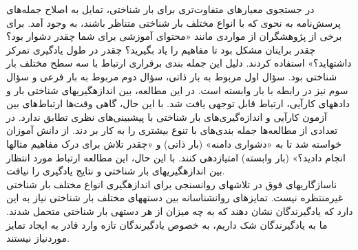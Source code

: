 در جستجوی معيارهای متفاوت‌تری برای بار شناختی، تمایل به اصلاح جمله‌های پرسش‌نامه به نحوی كه
با  انواع مختلف  بار  شناختی متناظر  باشند، به  وجود  آمد.  برای برخی از  پژوهشگران  از  مواردی مانند
«محتوای آموزشی برای شما چقدر دشوار بود؟ چقدر برایتان مشکل بود تا مفاهيم را یاد بگيرید؟ چقدر در 
طول یادگيری تمركز داشتهاید؟» استفاده كردند. دليل این جمله بندی برقراری ارتباط با سه سطح مختلف 
بار شناختی بود. سؤال اول مربوط به بار ذاتی، سؤال دوم مربوط به بار فرعی و سؤال سوم نيز در رابطه با بار 
وابسته است. در این مطالعه، بين اندازهگيریهای شناختی بار و دادههای كارآیی، ارتباط قابل توجهی
یافت شد. با این حال، گاهی وقت‌ها  ارتباط‌های بين آزمون  كارآیی و  اندازه‌گيری‌های بار  شناختی با 
پيشبينی‌های نظری تطابق ندارد. در تعدادی از مطالعه‌ها جمله بندی‌های با تنوع بيشتری را به كار بر دند. 
از دانش آموزان خواسته شد تا به «دشواری دامنه» (بار ذاتی) و «چقدر تلاش برای درک مفاهيم مثالها 
انجام  دادید؟» (بار وابسته) امتيازدهی كنند.  با این حال، این مطالعه  ارتباط  مورد  انتظار  بين
اندازهگيریهای بار شناختی و نتایج یادگيری را نيافت.
\cite{sweller2011measuring}
\\
ناسازگاریهای فوق در تلاشهای روانسنجی برای اندازهگيری انواع مختلف بار شناختی غيرمنتظره
نيست. تمایزهای روانشناسانه بين دستههای مختلف بار شناختی نياز به این دارد كه یادگيرندگان نشان 
دهند كه به چه ميزان از هر دستهی بار شناختی متحمل شدند. ما به یادگيرندگان شک داریم، به خصوص 
یادگيرندگان تازه وارد قادر به ایجاد تمایز موردنياز نيستند.
\cite{sweller2011measuring}
\\